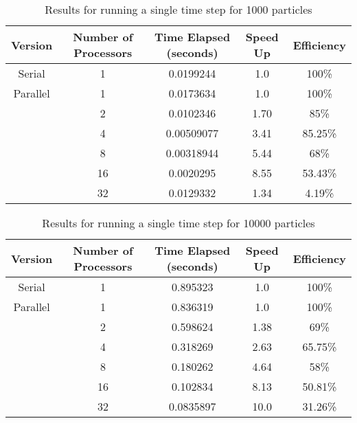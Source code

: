 \documentclass[11pt]{article}
\begin{document}
    \begin{table}[H]
        \centering
    \begin{tabular}{|c|c|c|c|c|}
        \hline
        Version & Number of Processors & Time Elapsed (seconds) & Speed Up & Efficiency \\
        \hline
        Serial & 1 & 0.0199244 & 1.0 & 100\% \\
        \hline
        Parallel & 1 & 0.0173634 & 1.0 & 100\% \\
                 & 2 & 0.0102346 & 1.70 & 85\% \\
                 & 4 & 0.00509077 & 3.41 & 85.25\% \\
                 & 8 & 0.00318944 & 5.44 & 68\% \\
                 & 16 & 0.0020295 & 8.55 & 53.43\% \\
                 & 32 & 0.0129332 & 1.34 & 4.19\% \\
        \hline
    \end{tabular}
    \caption{Results for running a single time step for 1000 particles}
    \label{n1000}
    \end{table}

    \begin{table}[H]
        \centering
        \begin{tabular}{|c|c|c|c|c|}
        \hline
        Version & Number of Processors & Time Elapsed (seconds) & Speed Up & Efficiency \\
        \hline
        Serial & 1 & 0.895323 & 1.0 & 100\% \\
        \hline
        Parallel & 1 & 0.836319 & 1.0 & 100\% \\
                 & 2 & 0.598624 & 1.38 & 69\% \\
                 & 4 & 0.318269 & 2.63 & 65.75\% \\
                 & 8 & 0.180262 & 4.64 & 58\% \\
                 & 16 & 0.102834 & 8.13 & 50.81\% \\
                 & 32 & 0.0835897 & 10.0 & 31.26\% \\
        \hline
        \end{tabular}
        \caption{Results for running a single time step for 10000 particles}
    \label{n10000}
    \end{table}
\end{document}
